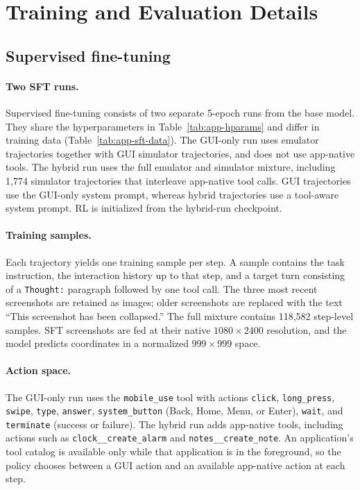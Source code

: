 \section{Training and Evaluation Details}
\label{app:details}

\subsection{Supervised fine-tuning}
\label{app:sft}

\paragraph{Two SFT runs.}
Supervised fine-tuning consists of two separate 5-epoch runs from the base model. They share the hyperparameters in Table~\ref{tab:app-hparams} and differ in training data (Table~\ref{tab:app-sft-data}). The GUI-only run uses emulator trajectories together with GUI simulator trajectories, and does not use app-native tools. The hybrid run uses the full emulator and simulator mixture, including 1,774 simulator trajectories that interleave app-native tool calls. GUI trajectories use the GUI-only system prompt, whereas hybrid trajectories use a tool-aware system prompt. RL is initialized from the hybrid-run checkpoint.

\paragraph{Training samples.}
Each trajectory yields one training sample per step. A sample contains the task instruction, the interaction history up to that step, and a target turn consisting of a \texttt{Thought:} paragraph followed by one tool call. The three most recent screenshots are retained as images; older screenshots are replaced with the text ``This screenshot has been collapsed.'' The full mixture contains 118,582 step-level samples. SFT screenshots are fed at their native $1080\times2400$ resolution, and the model predicts coordinates in a normalized $999\times999$ space.

\paragraph{Action space.}
The GUI-only run uses the \texttt{mobile\_use} tool with actions \texttt{click}, \texttt{long\_press}, \texttt{swipe}, \texttt{type}, \texttt{answer}, \texttt{system\_button} (Back, Home, Menu, or Enter), \texttt{wait}, and \texttt{terminate} (success or failure). The hybrid run adds app-native tools, including actions such as \texttt{clock\_\_create\_alarm} and \texttt{notes\_\_create\_note}. An application's tool catalog is available only while that application is in the foreground, so the policy chooses between a GUI action and an available app-native action at each step.



